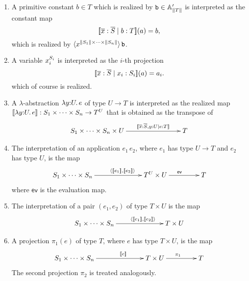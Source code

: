 \begin{enumerate}
\item A primitive constant $b \in T$ which is realized by $\mathtt{b}
  \in \mathbb{A}'_{\|T\|}$ is interpreted as the constant map
  \begin{equation*}
    [\![\overline{x} : \overline{S} \mid b : T]\!](a) = b,
  \end{equation*}
  which is realized by $\langle x^{\|S_1\| \times \cdots \times
      \|S_n\|} \rangle\, \mathtt{b}$.
\item A variable $x_i^{S_i}$ is interpreted as the $i$-th
  projection
  \begin{equation*}
    [\![\overline{x} : \overline{S} \mid x_i : S_i]\!](a) = a_i.
  \end{equation*}
  which of course is realized.
\item A $\lambda$-abstraction $\lambda y {:} U .\,e$ of type $U
  \to T$ is interpreted as the realized map
  $[\![\lambda y {:} U .\,e]\!] : S_1 \times \cdots \times
  S_n \to T^{U}$ that is obtained as the transpose
  of
  \begin{equation*}
    \xymatrix@+2em{
      **[l]{S_1 \times \cdots \times S_n \times U}
      \ar[r]^{\sem{\overline{x}:\overline{S}, y : U \ctx e
        : T}}
      &
      {T}
    }
  \end{equation*}
\item The interpretation of an application $e_1\,e_2$, where $e_1$ has
  type $U \to T$ and $e_2$ has type $U$, is the map
  \begin{equation*}
    \xymatrix@+2em{
      **[l]{S_1 \times \cdots \times S_n}
      \ar[r]^{\pair{\sem{e_1}, \sem{e_2}}}
      &
      {T^{U} \times U}
      \ar[r]^{\mathsf{ev}}
      &
      {T}      
    }
  \end{equation*}
  where $\mathsf{ev}$ is the evaluation map.
\item The interpretation of a pair $(e_1, e_2)$ of type $T
  \times U$ is the map
  \begin{equation*}
    \xymatrix@+2em{
      **[l]{S_1 \times \cdots \times S_n}
      \ar[r]^{\pair{\sem{e_1}, \sem{e_2}}}
      &
      {T \times U}
    }
  \end{equation*}
\item A projection $\pi_1(e)$ of type $T$, where $e$ has type
  $T \times U$, is the map
  \begin{equation*}
    \xymatrix@+2em{
      **[l]{S_1 \times \cdots \times S_n}
      \ar[r]^{\sem{e}}
      &
      {T \times U}
      \ar[r]^{\pi_1}
      &
      {T}
    }
  \end{equation*}
  The second projection $\pi_2$ is treated analogously.
\end{enumerate}
